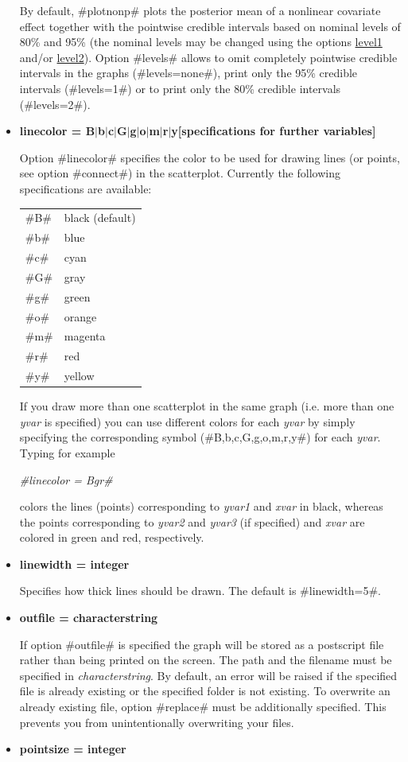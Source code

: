 \begin{itemize}
By default, #plotnonp# plots the posterior mean of a nonlinear
covariate effect together with the pointwise credible intervals
based on nominal levels of 80\% and 95\% (the nominal levels may
be changed using the options \hyperref[level1]{level1} and/or
\hyperref[level2]{level2}). Option #levels# allows to omit
completely pointwise credible intervals in the graphs
(#levels=none#), print only the 95\% credible intervals
(#levels=1#) or to print only the 80\% credible intervals
(#levels=2#).
\item {\bf linecolor = B$|$b$|$c$|$G$|$g$|$o$|$m$|$r$|$y[specifications for further variables]}

Option #linecolor# specifies the color to be used for drawing
lines (or points, see option #connect#) in the scatterplot.
Currently the following specifications are available:

\begin{tabular}{ll}
#B# & black (default) \\
#b# & blue \\
#c# & cyan \\
#G# & gray \\
#g# & green \\
#o# & orange \\
#m# & magenta \\
#r# & red \\
#y# & yellow
\end{tabular}

If you draw more than one scatterplot in the same graph (i.e. more
than one {\em yvar} is specified) you can use different colors for
each {\em yvar} by simply specifying the corresponding symbol
(#B,b,c,G,g,o,m,r,y#) for each {\em yvar}. Typing for example

{\em #linecolor = Bgr#}

colors the lines (points) corresponding to {\em yvar1} and {\em
xvar} in black, whereas the points corresponding to {\em yvar2}
and {\em yvar3} (if specified) and {\em xvar} are colored in green
and red, respectively.
\item {\bf linewidth = integer}

Specifies how thick lines should be drawn. The default is
#linewidth=5#.
\item {\bf outfile = characterstring}

If option #outfile# is specified the graph will be stored as a
postscript file rather than being printed on the screen. The path
and the filename must be specified in {\em characterstring}. By
default, an error will be raised if the specified file is already
existing or the specified folder is not existing. To overwrite  an
already existing file, option #replace# must be additionally
specified. This prevents you from unintentionally overwriting your
files.
\item {\bf pointsize = integer}


\end{itemize}
